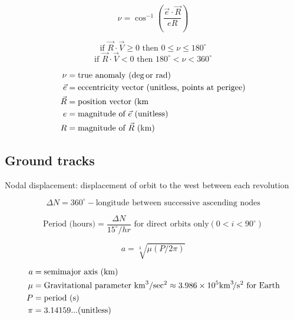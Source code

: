 \documentclass{article}
\newcommand{\myvarmukm}{\mu &= \text{Gravitational parameter \si{\kilo\meter\cubed\per\sec\squared}} \approx 3.986 \times 10^5 \si{\kilo\meter\cubed\per\second\squared} \text{ for Earth}}
\begin{document}
\begin{multicols}{3}
	\begin{equation*}
	\boxed{\nu = \cos^{-1} \left(\dfrac{\vec{e}\cdot\vec{R}}{eR}\right)}
	\end{equation*}
	
	\begin{equation*}
	\text{if } \vec{R}\cdot\vec{V} \geq 0 \text{ then } 0 \leq \nu \leq 180^\circ
	\end{equation*}
	\begin{equation*}
	\text{if } \vec{R}\cdot\vec{V} < 0 \text{ then } 180^\circ < \nu < 360^\circ
	\end{equation*}

	\vfill\null
	\columnbreak

	\begin{align*}
	\nu &= \text{true anomaly (\si{\deg \text{or } \radian})}\\
	\vec{e} &= \text{eccentricity vector (unitless, points at perigee)}\\
	\vec{R} &= \text{position vector (\si{\kilo\meter}}\\
	e &= \text{magnitude of $\vec{e}$ (unitless)}\\
	R &= \text{magnitude of $\vec{R}$ (\si{\kilo\meter})}\\
	\end{align*}
\end{multicols}

\subsection{Ground tracks}
Nodal displacement: displacement of orbit to the west between each revolution

\begin{equation*}
\boxed{\Delta N = 360^\circ - \text{longitude between successive ascending nodes}}
\end{equation*}

\begin{equation*}
\boxed{\text{Period (hours)} = \dfrac{\Delta N}{15^\circ / hr}}
\text{ for direct orbits only} (0 < i < 90^\circ)
\end{equation*}

\begin{multicols}{3}
	\begin{equation*}
	\boxed{a = \sqrt[3]{\mu (P / 2\pi)}}
	\end{equation*}
	
	\vfill\null
	\columnbreak
	
	\begin{align*}
	a &= \text{semimajor axis (\si{\kilo\meter)}}\\
	\myvarmukm\\
	P &= \text{period (\si{\second})}\\
	\pi &= 3.14159... \text{(unitless)}\\
	\end{align*}
\end{multicols}
\end{document}
